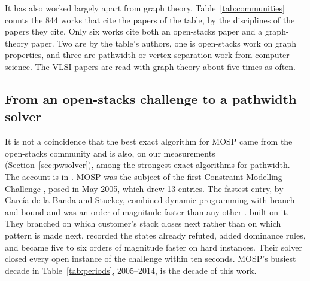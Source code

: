 \begin{table}[t]
\centering\small
\caption{The open-stacks papers are read apart from graph theory. Works citing
the papers that the Linhares--Yanasse table cites, by the discipline of the
papers they cite. Of 135 works citing an operations-research paper, 6 also cite
a graph-theory paper (4\%); of 285 citing a VLSI paper, 65 do (23\%). The 2002
paper itself counts as operations research. OpenAlex, 29 September 2026; 844
citing works in all.}
\label{tab:communities}

\end{table}

It has also worked largely apart from graph theory. Table~\ref{tab:communities}
counts the 844 works that cite the papers of the table, by the disciplines of
the papers they cite. Only six works cite both an open-stacks paper and a
graph-theory paper. Two are by the table's authors, one is open-stacks work on
graph properties, and three are pathwidth or vertex-separation work from
computer science. The VLSI papers are read with graph theory about five times as
often.

\subsection{From an open-stacks challenge to a pathwidth solver}

It is not a coincidence that the best exact algorithm for MOSP came from the
open-stacks community and is also, on our measurements (Section~\ref{sec:pwsolver}), among the strongest exact algorithms for pathwidth. The account is
in \citet[\S1]{ChuStuckey2009}. MOSP was the subject of the first Constraint
Modelling Challenge \citep{SmithGent2005}, posed in May 2005, which drew 13
entries. The fastest entry, by García de la Banda and Stuckey, combined dynamic
programming with branch and bound and was an order of magnitude faster than
any other \citep{GarciaDeLaBandaStuckey2007}. \citet{ChuStuckey2009} built on
it. They branched on which customer's stack closes next rather than on which
pattern is made next, recorded the states already refuted, added dominance
rules, and became
five to six orders of magnitude faster on hard instances. Their solver closed
every open instance of the challenge within ten seconds. MOSP's busiest decade
in Table~\ref{tab:periods}, 2005--2014, is the decade of this work.

